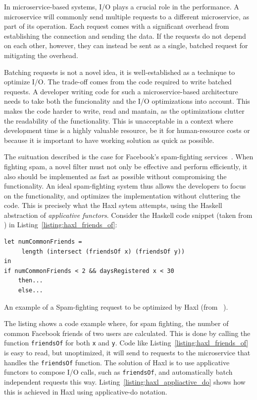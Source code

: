 In microservice-based systems, \ac{I/O} plays a crucial role in the performance.
A microservice will commonly send multiple requests to a different microservice, as part of its operation.
Each request comes with a significant overhead from establishing the connection and sending the data.
If the requests do not depend on each other, however, they can instead be sent as a single, batched request for mitigating the overhead.

Batching requests is not a novel idea, it is well-established as a technique to optimize \ac{I/O}.
The trade-off comes from the code required to write batched requests.
A developer writing code for such a microservice-based architecture needs to take both the funcionality and the \ac{I/O} optimizations into account.
This makes the code harder to write, read and mantain, as the optimizations clutter the readability of the functionality.
This is unacceptable in a context where development time is a highly valuable resource, be it for human-resource costs or because it is important to have working solution as quick as possible. 

The suituation described is the case for Facebook's spam-fighting services~\cite{marlow2014haxl}.
When fighting spam, a novel filter must not only be effective and perform efficiently, it also should be implemented as fast as possible without compromising the functionality.
An ideal spam-fighting system thus allows the developers to focus on the functionality, and optimizes the implementation without cluttering the code.
This is precisely what the Haxl sytem attempts, using the Haskell abstraction of \emph{applicative functors}.
Consider the Haskell code snippet (taken from \cite{marlow2014haxl}) in Listing~\ref{listing:haxl_friends_of}:

\begin{listing}[h]
\begin{verbatim}
let numCommonFriends =
     length (intersect (friendsOf x) (friendsOf y))
in
if numCommonFriends < 2 && daysRegistered x < 30
    then...
    else...
\end{verbatim}
\caption{An example of a Spam-fighting request to be optimized by Haxl (from ~\cite{marlow2014haxl}).}
\label{listing:haxl_friends_of}
\end{listing}

The listing shows a code example where, for spam fighting, the number of common Facebook friends of two users are calculated.
This is done by calling the function \texttt{friendsOf} for both \texttt{x} and \texttt{y}.
Code like Listing~\ref{listing:haxl_friends_of} is easy to read, but unoptimized, it will send to requests to the microservice that handles the \texttt{friendsOf} function.
The solution of Haxl is to use applicative functors to compose \ac{I/O} calls, such as \texttt{friendsOf}, and automatically batch independent requests this way.
Listing~\ref{listing:haxl_appliactive_do} shows how this is achieved in Haxl using applicative-do notation.

